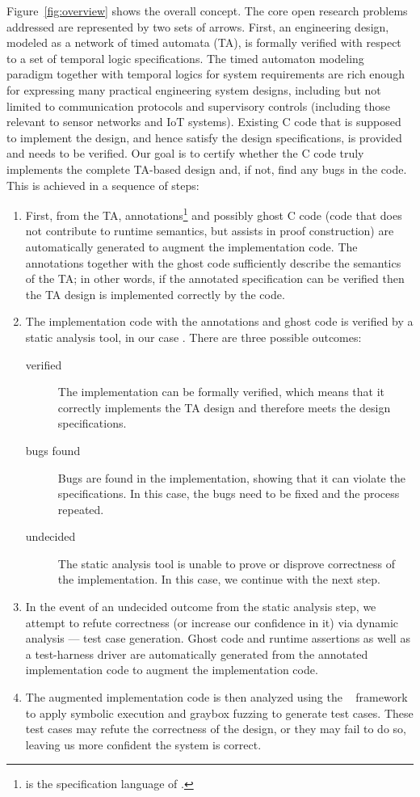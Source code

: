 Figure~\ref{fig:overview} shows the overall concept.  The core
open research problems addressed are represented by two sets of
arrows.  First, an engineering design, modeled as a network of timed
automata (TA), is formally verified with respect to a set of temporal logic specifications.
The timed automaton modeling paradigm together with temporal logics
for system requirements are rich enough for expressing many practical
engineering system designs, including but not limited to communication
protocols and supervisory controls (including those relevant to sensor
networks and IoT systems).  Existing C code that is supposed to
implement the design, and hence satisfy the design specifications, is provided and needs to be verified.
Our goal is to certify whether the C code truly implements the complete TA-based design and, if not, find any bugs in the code.
This is achieved in a sequence of steps:
\begin{enumerate}
\item First, from the TA, \acsl annotations\footnote{\acsl is the
    specification language of \framac{}.} and possibly ghost C code
  (code that does not contribute to runtime semantics, but assists in
  proof construction) are automatically generated to augment the
  implementation code. The annotations together with the ghost code
  sufficiently describe the semantics of the TA; in other words, if
  the annotated specification can be verified then the TA design is implemented correctly by the code.
\item The implementation code with the \acsl annotations and ghost code
  is verified by a static analysis tool, in our case \framac.
  There are three possible outcomes:
  \begin{description}
  \item[verified] The implementation can be formally verified, which means that it correctly implements the TA design and therefore meets the design specifications.
  \item[bugs found] Bugs are found in the implementation, showing that
    it can violate the specifications. In this case, the bugs need to be fixed and the process repeated.
  \item[undecided] The static analysis tool is unable to prove or disprove correctness of the implementation.
  In this case, we continue with the next step.
  \end{description}
\item In the event of an undecided outcome from the static analysis
  step, we attempt to refute correctness (or increase our confidence
  in it) via dynamic analysis --- test case generation.
  Ghost code and runtime assertions as well as a test-harness driver are automatically generated from the
  annotated implementation code to augment the implementation code.
\item The augmented implementation code is then analyzed using the
  \deepstate~\cite{DeepState} framework to apply symbolic execution and graybox fuzzing
  to generate test cases.  These test cases may refute the correctness
  of the design, or they may fail to do so, leaving us more confident
  the system is correct.
\end{enumerate}

